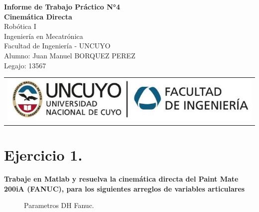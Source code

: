 \documentclass[a4paper,12pt]{article}
\begin{document}
\begin{titlepage}
    \centering
    \vspace*{5cm}
    {\Huge\bfseries Informe de Trabajo Práctico N°4}\\
    \vspace{0.2cm}
    {\Large \textbf{Cinemática Directa}}\\
    \vspace{0.5cm}
    {\Large Robótica I}\\
    \vspace{0.5 cm}
    {\Large Ingeniería en Mecatrónica}\\
    \vspace{0.2 cm}
    {\Large Facultad de Ingeniería - UNCUYO}\\
    \vspace{1.5cm}
    Alumno: Juan Manuel BORQUEZ PEREZ\\
    Legajo: 13567\\
    \vfill
    {\begin{tabular}{@{}c@{}}\includegraphics[scale=0.4]{escudo.PNG}\end{tabular}}\hspace{10pt}
\end{titlepage}

\section{Ejercicio 1.}
\textbf{Trabaje en Matlab y resuelva la cinemática directa del Paint Mate 200iA (FANUC), para los siguientes arreglos de variables articulares}

\begin{figure}[H]
    \centering
    \begin{adjustbox}{scale = 0.35, max width=\columnwidth}
    \end{adjustbox}
    \caption{Parametros DH Fanuc.}
\end{figure}
\end{document}
